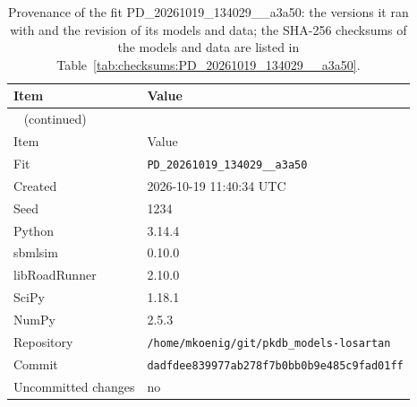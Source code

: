 \documentclass{article}
\begin{document}
\begin{longtable}{ll}
\caption{Provenance of the fit PD\_20261019\_134029\_\_a3a50: the versions it ran with and the revision of its models and data; the SHA-256 checksums of the models and data are listed in Table~\ref{tab:checksums:PD_20261019_134029__a3a50}.}\label{tab:provenance:PD_20261019_134029__a3a50} \\
\toprule
Item & Value \\
\midrule
\endfirsthead
\multicolumn{2}{l}{\small\tablename~\thetable{} (continued)} \\
\toprule
Item & Value \\
\midrule
\endhead
\bottomrule
\endlastfoot
Fit & \texttt{PD\_20261019\_134029\_\_a3a50} \\
Created & 2026-10-19 11:40:34 UTC \\
Seed & 1234 \\
Python & 3.14.4 \\
sbmlsim & 0.10.0 \\
libRoadRunner & 2.10.0 \\
SciPy & 1.18.1 \\
NumPy & 2.5.3 \\
Repository & \texttt{/home/mkoenig/git/pkdb\_models-losartan} \\
Commit & \texttt{dadfdee839977ab278f7b0bb0b9e485c9fad01ff} \\
Uncommitted changes & no \\
\end{longtable}



\end{document}
